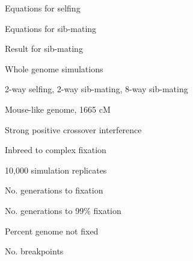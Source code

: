 \documentclass[aspectratio=169,12pt,t]{beamer}
\begin{document}
\begin{frame}[c]{Equations for selfing}


\end{frame}



\begin{frame}[c]{Equations for sib-mating}


\end{frame}


\begin{frame}[c]{Result for sib-mating}


\end{frame}




\begin{frame}[c]{Whole genome simulations}

\bbi
\item 2-way selfing, 2-way sib-mating, 8-way sib-mating

\item Mouse-like genome, 1665 cM

\item Strong positive crossover interference

\item Inbreed to complex fixation

\item 10,000 simulation replicates
\ei

  \end{frame}


\begin{frame}[c]{No. generations to fixation}
\end{frame}

\begin{frame}[c]{No. generations to 99\% fixation}
\end{frame}

\begin{frame}[c]{Percent genome not fixed}
\end{frame}

\begin{frame}[c]{No. breakpoints}
\end{frame}
\end{document}
